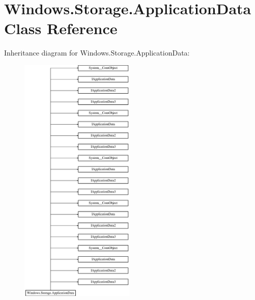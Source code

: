 \hypertarget{class_windows_1_1_storage_1_1_application_data}{}\section{Windows.\+Storage.\+Application\+Data Class Reference}
\label{class_windows_1_1_storage_1_1_application_data}
Inheritance diagram for Windows.\+Storage.\+Application\+Data\+:\begin{figure}[H]
\begin{center}
\leavevmode
\includegraphics[height=12.000000cm]{class_windows_1_1_storage_1_1_application_data}
\end{center}
\end{figure}
